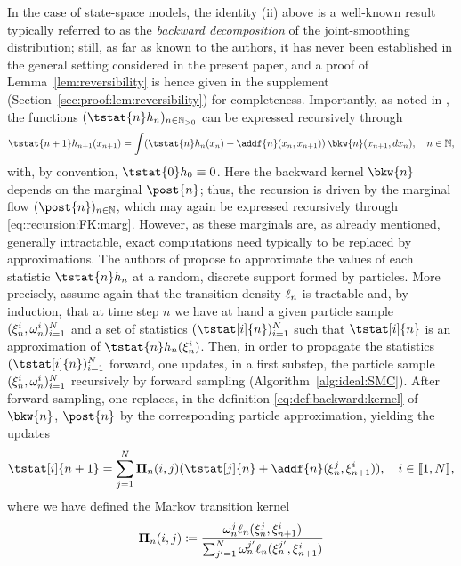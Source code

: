 In the case of state-space models, the identity (ii) above is a well-known result typically referred to as the \emph{backward decomposition} of the joint-smoothing distribution; still, as far as known to the authors, it has never been established in the general setting considered in the present paper, and a proof of Lemma~\ref{lem:reversibility} is hence given in the supplement (Section~\ref{sec:proof:lem:reversibility}) for completeness. Importantly, as noted in \cite{cappe:2009}, the functions $(\tstat{n} h_n)_{n \in \nsetpos}$ can be expressed recursively through  
\begin{equation} \label{eq:forward:smoothing}
\tstat{n + 1} h_{n + 1}(x_{n + 1}) = \int (\tstat{n} h_n(x_n) + \addf{n}(x_n, x_{n + 1})) \, \bkw{n}(x_{n + 1}, \rmd x_n), \quad n \in \nset, 
\end{equation}
with, by convention, $\tstat{0} h_0 \equiv 0$. Here the backward kernel $\bkw{n}$ depends on the marginal $\post{n}$; thus, the recursion is driven by the marginal flow $(\post{n})_{n \in \nset}$, which may again be expressed recursively through \eqref{eq:recursion:FK:marg}. However, as these marginals are, as already mentioned, generally intractable, exact computations need typically to be replaced by approximations. The authors of \cite{delmoral:doucet:singh:2010} propose to approximate the values of each statistic $\tstat{n} h_n$ at a random, discrete support formed by particles. More precisely, assume again that the transition density $\ell_{n}$ is tractable and, by induction, that at time step $n$ we have at hand a given particle sample $(\xi_{n}^{i}, \omega_{n}^{i})_{i = 1}^N$ and a set of statistics $(\tstat[i]{n})_{i = 1}^\N$ such that $\tstat[i]{n}$ is an approximation of $\tstat{n} h_n(\epart{n}{i})$. Then, in order to propagate the statistics $(\tstat[i]{n})_{i = 1}^\N$ forward, one updates, in a first substep, the particle sample $(\xi_{n}^{i}, \omega_{n}^{i})_{i = 1}^N$ recursively by forward sampling (Algorithm~\ref{alg:ideal:SMC}). After forward sampling, one replaces, in the definition \eqref{eq:def:backward:kernel} of $\bkw{n}$, $\post{n}$ by the corresponding particle approximation, yielding the updates 
\begin{equation} \label{eq:tstat:FFBSm:update}
\tstat[i]{n + 1} = \sum_{j = 1}^\N \trm{n}(i, j) (\tstat[j]{n} + \addf{n}(\epart{n}{j}, \epart{n + 1}{i})), \quad i \in \intvect{1}{\N}, 
\end{equation} 
where we have defined the Markov transition kernel  
\begin{equation} \label{eq:def:trm}
\trm{n}(i, j) \eqdef \frac{\ewght{n}{j} \ud{n}(\epart{n}{j}, \epart{n + 1}{i})}{\sum_{j' = 1}^\N \ewght{n}{j'} \ud{n}(\epart{n}{j'}, \epart{n + 1}{i})}
\end{equation}

